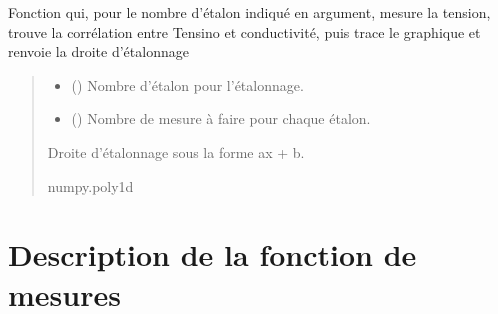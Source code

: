 \documentclass[letterpaper,10pt,french]{sphinxmanual}
\begin{document}
\begin{fulllineitems}
\label{\detokenize{Documentation:ADNI_ProgrammePython.Etalonnage}}
\pysigstartsignatures
{}
\pysigstopsignatures
\sphinxAtStartPar
Fonction qui, pour le nombre d’étalon indiqué en argument, mesure la tension, trouve la corrélation entre Tensino et conductivité, puis trace le graphique et renvoie la droite d’étalonnage
\begin{quote}\begin{description}
\begin{itemize}
\item {} 
\sphinxAtStartPar
{} () \textendash{} Nombre d’étalon pour l’étalonnage.

\item {} 
\sphinxAtStartPar
{} () \textendash{} Nombre de mesure à faire pour chaque étalon.

\end{itemize}

\sphinxAtStartPar
{} \textendash{} Droite d’étalonnage sous la forme ax + b.

\sphinxAtStartPar
numpy.poly1d

\end{description}\end{quote}

\end{fulllineitems}



\section{Description de la fonction de mesures}
\label{\detokenize{Documentation:description-de-la-fonction-de-mesures}}
\end{document}
